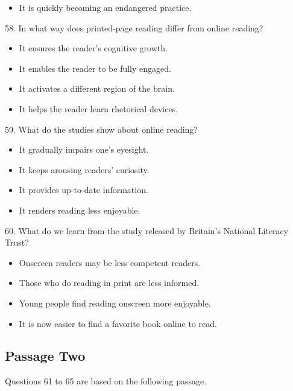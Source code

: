 \documentclass[UTF8,11pt]{ctexart}
\begin{document}
\begin{itemize}[leftmargin=2em,itemsep=.2em,topsep=.4em]\item[D.] It is quickly becoming an endangered practice.
\end{itemize}

58. In what way does printed-page reading differ from online reading?


\begin{itemize}[leftmargin=2em,itemsep=.2em,topsep=.4em]\item[A.] It ensures the reader’s cognitive growth.
\item[B.] It enables the reader to be fully engaged.
\item[C.] It activates a different region of the brain.
\item[D.] It helps the reader learn rhetorical devices.
\end{itemize}

59. What do the studies show about online reading?


\begin{itemize}[leftmargin=2em,itemsep=.2em,topsep=.4em]\item[A.] It gradually impairs one’s eyesight.
\item[B.] It keeps arousing readers’ curiosity.
\item[C.] It provides up-to-date information.
\item[D.] It renders reading less enjoyable.
\end{itemize}

60. What do we learn from the study released by Britain’s National Literacy Trust?


\begin{itemize}[leftmargin=2em,itemsep=.2em,topsep=.4em]\item[A.] Onscreen readers may be less competent readers.
\item[B.] Those who do reading in print are less informed.
\item[C.] Young people find reading onscreen more enjoyable.
\item[D.] It is now easier to find a favorite book online to read.
\end{itemize}

\subsection*{\textbf{Passage Two}}


Questions 61 to 65 are based on the following passage.
\end{document}
